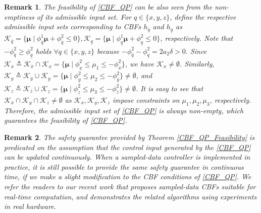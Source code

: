 \documentclass[journal,10pt]{IEEEtran}
\newtheorem{remark}{\bfseries Remark}
\newcommand{\vect}[1]{\boldsymbol{\mathbf{#1}}}
\begin{document}

\begin{remark}
The feasibility of \eqref{CBF_QP} can be also seen from the non-emptiness of its admissible input set. 
For $q\in\{x,y,z\}$, define the respective admissible input sets corresponding to CBFs $h_{\overline{q}}$ and $h_{\underline{q}}$ as $\mathcal{K}_{\overline{q}}=\{\vect{\mu}\mid \phi_{\overline{q}}^1\vect{\mu}+\phi_{\overline{q}}^2\leq 0\},\mathcal{K}_{\underline{q}}=\{\vect{\mu}\mid \phi_{\underline{q}}^1\vect{\mu}+\phi_{\underline{q}}^2\leq 0\}$, respectively.  
Note that $-\phi_{\overline{q}}^{2}\geq\phi_{\underline{q}}^2$ holds $\forall q\in\{x,y,z\}$ because $-\phi_{\overline{q}}^2 - \phi_{\underline{q}}^2=2a_2\delta>0$. Since $\mathcal{K}_{x}\triangleq\mathcal{K}_{\overline{x}}\cap \mathcal{K}_{\underline{x}}=\{\vect{\mu}\mid \phi_{\underline{x}}^2\leq \mu_1\leq -\phi_{\overline{x}}^2\}$, we have $\mathcal{K}_{x}\neq\emptyset$. Similarly, 
$\mathcal{K}_{y}\triangleq\mathcal{K}_{\overline{y}}\cup \mathcal{K}_{\underline{y}}=\{\vect{\mu}\mid \phi_{\underline{y}}^2\leq \mu_2\leq -\phi_{\overline{y}}^2\}\neq\emptyset$, and
$\mathcal{K}_{z}\triangleq\mathcal{K}_{\overline{z}}\cup \mathcal{K}_{\underline{z}}=\{\vect{\mu}\mid \phi_{\underline{z}}^2\leq \mu_3\leq -\phi_{\overline{z}}^2\}\neq\emptyset$. It is easy to see that $\mathcal{K}_{x}\cap\mathcal{K}_{y}\cap\mathcal{K}_{z}\neq\emptyset$ as
 $\mathcal{K}_{x},\mathcal{K}_{y},\mathcal{K}_{z}$ impose constraints on $\mu_1,\mu_2,\mu_3$, respectively. Therefore, the admissible input set  of \eqref{CBF_QP} is always non-empty, which guarantees the feasibility of \eqref{CBF_QP}.
\end{remark}

\begin{remark} \label{sdcbf}
The safety guarantee provided by Theorem \ref{CBF_QP_Feasibility} is predicated on the assumption that the control input generated by the \eqref{CBF_QP} can be updated continuously. When a sampled-data controller is implemented in practice, it is still possible to provide the same safety guarantee in continuous time, if we make a slight modification to the CBF conditions of \eqref{CBF_QP}. We refer the readers to our recent work \cite{zhang21interval} that proposes  %
sampled-data CBFs suitable for real-time computation, and demonstrates the related algorithms using experiments in real hardware.
\end{remark}
\end{document}
